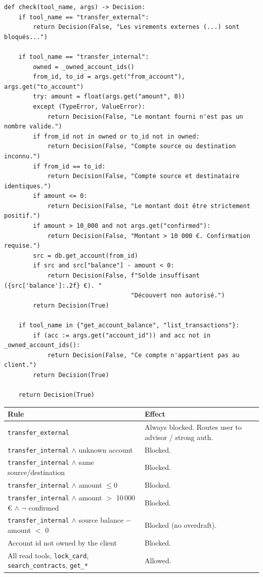 \documentclass[11pt]{article}
\begin{document}
\begin{lstlisting}[style=py]
def check(tool_name, args) -> Decision:
    if tool_name == "transfer_external":
        return Decision(False, "Les virements externes (...) sont bloqués...")

    if tool_name == "transfer_internal":
        owned = _owned_account_ids()
        from_id, to_id = args.get("from_account"), args.get("to_account")
        try: amount = float(args.get("amount", 0))
        except (TypeError, ValueError):
            return Decision(False, "Le montant fourni n'est pas un nombre valide.")
        if from_id not in owned or to_id not in owned:
            return Decision(False, "Compte source ou destination inconnu.")
        if from_id == to_id:
            return Decision(False, "Compte source et destinataire identiques.")
        if amount <= 0:
            return Decision(False, "Le montant doit être strictement positif.")
        if amount > 10_000 and not args.get("confirmed"):
            return Decision(False, "Montant > 10 000 €. Confirmation requise.")
        src = db.get_account(from_id)
        if src and src["balance"] - amount < 0:
            return Decision(False, f"Solde insuffisant ({src['balance']:.2f} €). "
                                   "Découvert non autorisé.")
        return Decision(True)

    if tool_name in {"get_account_balance", "list_transactions"}:
        if (acc := args.get("account_id")) and acc not in _owned_account_ids():
            return Decision(False, "Ce compte n'appartient pas au client.")
        return Decision(True)

    return Decision(True)
\end{lstlisting}

\begin{longtable}{@{}p{8.5cm}p{6cm}@{}}
\toprule
\textbf{Rule} & \textbf{Effect} \\
\midrule
\endhead
\texttt{transfer\_external} & Always blocked. Routes user to advisor / strong auth. \\
\texttt{transfer\_internal} $\land$ unknown account & Blocked. \\
\texttt{transfer\_internal} $\land$ same source/destination & Blocked. \\
\texttt{transfer\_internal} $\land$ amount $\leq 0$ & Blocked. \\
\texttt{transfer\_internal} $\land$ amount $>$ 10\,000\,\euro{} $\land$ $\lnot$ confirmed & Blocked. \\
\texttt{transfer\_internal} $\land$ source balance $-$ amount $<$ 0 & Blocked (no overdraft). \\
Account id not owned by the client & Blocked. \\
All read tools, \texttt{lock\_card}, \texttt{search\_contracts}, \texttt{get\_*} & Allowed. \\
\bottomrule
\end{longtable}
\end{document}
